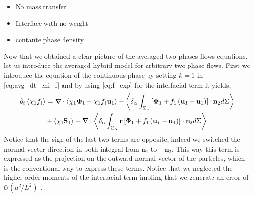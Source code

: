\begin{itemize}
    \item No mass transfer
    \item Interface with no weight 
    \item contante phase density
\end{itemize}

Now that we obtained a clear picture of the averaged two phases flows equations, let us introduce the averaged hybrid model for arbitrary two-phase flows. 
First we introduce the equation of the continuous phase by setting $k = 1$ in \ref{eq:avg_dt_chi_f} and by using \ref{eq:f_exp} for the interfacial term it yields,
\begin{multline}
    \partial_t \left<\chi_1 f_1\right>
    = \bm{\nabla} \cdot \left<\chi_1 \bm{\Phi}_1 - \chi_1 f_1 \textbf{u}_1\right>
    - \left<\delta_\alpha \int_{\Sigma_\alpha}\left[
        \mathbf{\Phi}_1
        + f_1
        \left(
            \textbf{u}_I
            - \textbf{u}_1
        \right)
    \right]
    \cdot \textbf{n}_2d\Sigma\right> \\
    + \left<\chi_1 \textbf{S}_1\right>
    +  \bm{\nabla} \cdot \left<\delta_\alpha \int_{\Sigma_\alpha} \textbf{r}\left[
        \mathbf{\Phi}_1
        + f_1
        \left(
            \textbf{u}_I
            - \textbf{u}_1
        \right)
    \right]
    \cdot \textbf{n}_2d\Sigma\right> 
    \label{eq:hybrid_avg_dt_chif}
\end{multline}
Notice that the sign of the last two terms are opposite, indeed we switched the normal vector direction in both integral from $\textbf{n}_1$ to $-\textbf{n}_2$. 
This way this term is expressed as the projection on the outward normal vector of the particles, which is the conventional way to express these terms. 
Notice that we neglected the higher order moments of the interfacial term impling that we generate an error of $\mathcal{O}\left(a^2/L^2\right)$ \citep{jackson1997locally}. 

